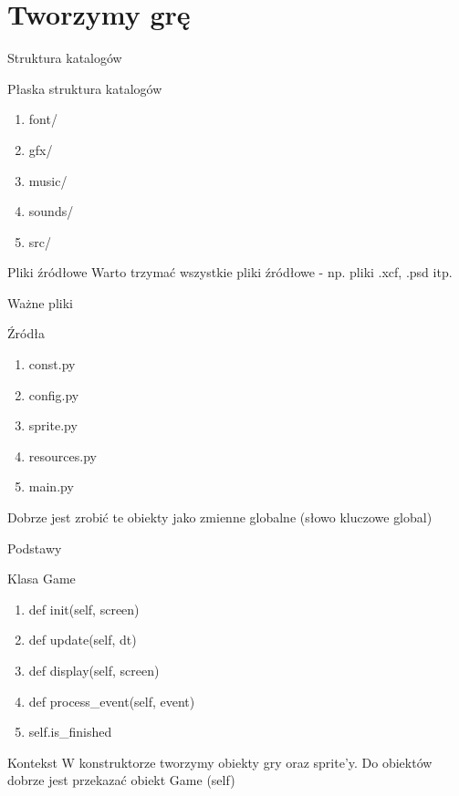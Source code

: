 \documentclass{beamer}
\begin{document}
\section{Tworzymy grę}

\begin{frame}{Struktura katalogów}
  \begin{block}{Płaska struktura katalogów}
    \begin{enumerate}
    \item font/
    \item gfx/
    \item music/
    \item sounds/
    \item src/
    \end{enumerate}
  \end{block}

  \begin{alertblock}{Pliki źródłowe}
    Warto trzymać wszystkie pliki źródłowe - np. pliki .xcf, .psd itp.
  \end{alertblock}
\end{frame}

\begin{frame}{Ważne pliki}
  \begin{block}{Źródła}
    \begin{enumerate}
    \item const.py
    \item config.py
    \item sprite.py
    \item resources.py
    \item main.py
    \end{enumerate}
  \end{block}

  \begin{alertblock}{}
    Dobrze jest zrobić te obiekty jako zmienne globalne (słowo
    kluczowe \alert{global})
  \end{alertblock}
\end{frame}

\begin{frame}{Podstawy}
  \begin{block}{Klasa Game}
    \begin{enumerate}
    \item def init(self, screen)
    \item def update(self, dt)
    \item def display(self, screen)
    \item def process\_event(self, event)
    \item self.is\_finished
    \end{enumerate}
  \end{block}

  \begin{block}{Kontekst}
    W konstruktorze tworzymy obiekty gry oraz sprite'y. Do obiektów
    dobrze jest przekazać obiekt Game (self)
  \end{block}
\end{frame}
\end{document}

